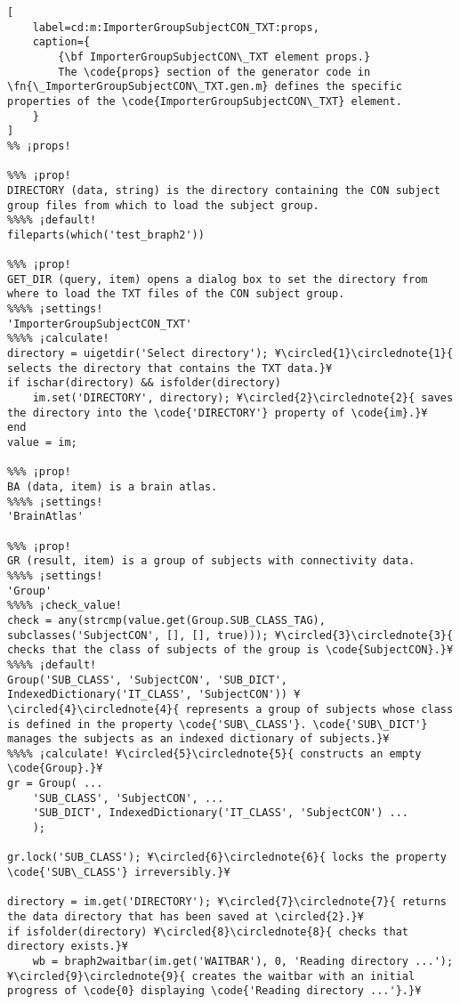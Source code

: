 \documentclass{tufte-handout}
\begin{document}
\begin{lstlisting}[
	label=cd:m:ImporterGroupSubjectCON_TXT:props,
	caption={
		{\bf ImporterGroupSubjectCON\_TXT element props.}
		The \code{props} section of the generator code in \fn{\_ImporterGroupSubjectCON\_TXT.gen.m} defines the specific properties of the \code{ImporterGroupSubjectCON\_TXT} element.
	}
]
%% ¡props!

%%% ¡prop!
DIRECTORY (data, string) is the directory containing the CON subject group files from which to load the subject group. 
%%%% ¡default!
fileparts(which('test_braph2'))

%%% ¡prop!
GET_DIR (query, item) opens a dialog box to set the directory from where to load the TXT files of the CON subject group.
%%%% ¡settings!
'ImporterGroupSubjectCON_TXT'
%%%% ¡calculate!
directory = uigetdir('Select directory'); ¥\circled{1}\circlednote{1}{ selects the directory that contains the TXT data.}¥
if ischar(directory) && isfolder(directory)
	im.set('DIRECTORY', directory); ¥\circled{2}\circlednote{2}{ saves the directory into the \code{'DIRECTORY'} property of \code{im}.}¥
end
value = im;

%%% ¡prop!
BA (data, item) is a brain atlas.
%%%% ¡settings!
'BrainAtlas'

%%% ¡prop!
GR (result, item) is a group of subjects with connectivity data.
%%%% ¡settings!
'Group'
%%%% ¡check_value!
check = any(strcmp(value.get(Group.SUB_CLASS_TAG), subclasses('SubjectCON', [], [], true))); ¥\circled{3}\circlednote{3}{ checks that the class of subjects of the group is \code{SubjectCON}.}¥
%%%% ¡default!
Group('SUB_CLASS', 'SubjectCON', 'SUB_DICT', IndexedDictionary('IT_CLASS', 'SubjectCON')) ¥\circled{4}\circlednote{4}{ represents a group of subjects whose class is defined in the property \code{'SUB\_CLASS'}. \code{'SUB\_DICT'} manages the subjects as an indexed dictionary of subjects.}¥
%%%% ¡calculate! ¥\circled{5}\circlednote{5}{ constructs an empty \code{Group}.}¥
gr = Group( ...
    'SUB_CLASS', 'SubjectCON', ...
    'SUB_DICT', IndexedDictionary('IT_CLASS', 'SubjectCON') ...
    );

gr.lock('SUB_CLASS'); ¥\circled{6}\circlednote{6}{ locks the property \code{'SUB\_CLASS'} irreversibly.}¥

directory = im.get('DIRECTORY'); ¥\circled{7}\circlednote{7}{ returns the data directory that has been saved at \circled{2}.}¥
if isfolder(directory) ¥\circled{8}\circlednote{8}{ checks that directory exists.}¥
    wb = braph2waitbar(im.get('WAITBAR'), 0, 'Reading directory ...'); ¥\circled{9}\circlednote{9}{ creates the waitbar with an initial progress of \code{0} displaying \code{'Reading directory ...'}.}¥
    

\end{lstlisting}
\end{document}
